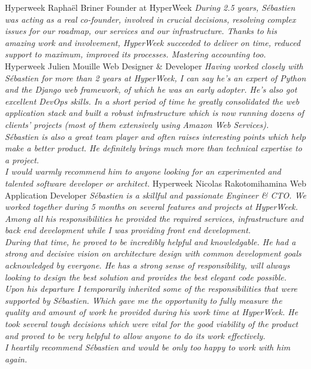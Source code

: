 \documentclass[]{friggeri-cv}
\begin{document}
\begin{entrylist}
  \entry
    {Hyperweek}
    {Raphaël Briner}
    {Founder at HyperWeek}
    {\emph{During 2.5 years, Sébastien was acting as a real co-founder, involved in crucial decisions, resolving complex issues for our roadmap, our services and our infrastructure. Thanks to his amazing work and involvement, HyperWeek succeeded to deliver on time, reduced support to maximum, improved its processes. Mastering accounting too.}}
  \entry
    {Hyperweek}
    {Julien Mouille}
    {Web Designer \& Developer}
    {\emph{Having worked closely with Sébastien for more than 2 years at HyperWeek, I can say he's an expert of Python and the Django web framework, of which he was an early adopter. He's also got excellent DevOps skills. In a short period of time he greatly consolidated the web application stack and built a robust infrastructure which is now running dozens of clients' projects (most of them extensively using Amazon Web Services).
    \\Sébastien is also a great team player and often raises interesting points which help make a better product. He definitely brings much more than technical expertise to a project.
    \\I would warmly recommend him to anyone looking for an experimented and talented software developer or architect.}}
  \entry
    {Hyperweek}
    {Nicolas Rakotomihamina}
    {Web Application Developer}
    {\emph{Sébastien is a skillful and passionate Engineer \& CTO. We worked together during 5 months on several features and projects at HyperWeek. Among all his responsibilities he provided the required services, infrastructure and back end development while I was providing front end development.
    \\During that time, he proved to be incredibly helpful and knowledgable. He had a strong and decisive vision on architecture design with common development goals acknowledged by everyone. He has a strong sense of responsibility, will always looking to design the best solution and provides the best elegant code possible.
    \\Upon his departure I temporarily inherited some of the responsibilities that were supported by Sébastien. Which gave me the opportunity to fully measure the quality and amount of work he provided during his work time at HyperWeek. He took several tough decisions which were vital for the good viability of the product and proved to be very helpful to allow anyone to do its work effectively.
    \\I heartily recommend Sébastien and would be only too happy to work with him again.}}

\end{entrylist}
\end{document}
